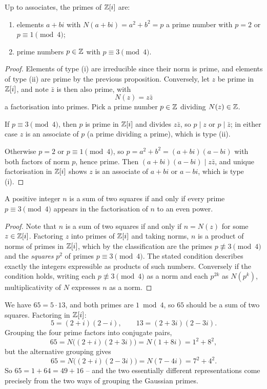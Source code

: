 \documentclass[a4paper]{scrartcl}
\begin{document}
\begin{theorem}[{Primes in $\Z[i]$}]
	Up to associates, the primes of $\Z[i]$ are:
	\begin{enumerate}[label=(\roman*)]
		\item elements $a + bi$ with $N(a + bi) = a^2 + b^2 = p$ a prime number with $p = 2$ or $p \equiv 1 \pmod 4$;
		\item prime numbers $p \in \mathbb{Z}$ with $p \equiv 3 \pmod 4$.
	\end{enumerate}
\end{theorem}
\begin{proof}
	Elements of type (i) are irreducible since their norm is prime, and elements of type (ii) are prime by the previous proposition. Conversely, let $z$ be prime in $\Z[i]$, and note $\bar{z}$ is then also prime, with
	$$
	N(z) = z \bar z
	$$
	a factorisation into primes. Pick a prime number $p \in \mathbb{Z}$ dividing $N(z) \in \mathbb{Z}$.

	If $p \equiv 3 \pmod 4$, then $p$ is prime in $\Z[i]$ and divides $z \bar z$, so $p \mid z$ or $p \mid \bar z$; in either case $z$ is an associate of $p$ (a prime dividing a prime), which is type (ii).

	Otherwise $p = 2$ or $p \equiv 1 \pmod 4$, so $p = a^2 + b^2 = (a + bi)(a - bi)$ with both factors of norm $p$, hence prime. Then $(a + bi)(a - bi) \mid z \bar z$, and unique factorisation in $\Z[i]$ shows $z$ is an associate of $a + bi$ or $a - bi$, which is type (i).
\end{proof}

\begin{corollary}
	A positive integer $n$ is a sum of two squares if and only if every prime $p \equiv 3 \pmod 4$ appears in the factorisation of $n$ to an even power.
\end{corollary}
\begin{proof}
	Note that $n$ is a sum of two squares if and only if $n = N(z)$ for some $z \in \mathbb{Z}[i]$. Factoring $z$ into primes of $\Z[i]$ and taking norms, $n$ is a product of norms of primes in $\Z[i]$, which by the classification are the primes $p \not\equiv 3 \pmod 4$ and the \emph{squares} $p^2$ of primes $p \equiv 3 \pmod 4$. The stated condition describes exactly the integers expressible as products of such numbers. Conversely if the condition holds, writing each $p \not\equiv 3 \pmod 4$ as a norm and each $p^{2k}$ as $N(p^k)$, multiplicativity of $N$ expresses $n$ as a norm.
\end{proof}

\begin{example}
	We have $65 = 5 \cdot 13$, and both primes are $1 \bmod 4$, so $65$ should be a sum of two squares. Factoring in $\Z[i]$:
	$$
	5 = (2 + i)(2 - i), \qquad 13 = (2 + 3i)(2 - 3i).
	$$
	Grouping the four prime factors into conjugate pairs,
	$$
	65 = N\big((2 + i)(2 + 3i)\big) = N(1 + 8i) = 1^2 + 8^2,
	$$
	but the alternative grouping gives
	$$
	65 = N\big((2 + i)(2 - 3i)\big) = N(7 - 4i) = 7^2 + 4^2.
	$$
	So $65 = 1 + 64 = 49 + 16$ -- and the two essentially different representations come precisely from the two ways of grouping the Gaussian primes.
\end{example}
\end{document}
